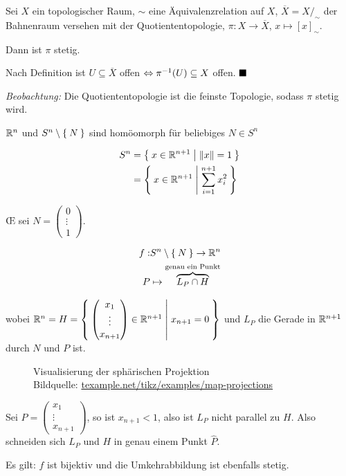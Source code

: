 \begin{korollar}
    Sei $X$ ein topologischer Raum, $\sim$ eine Äquivalenzrelation auf
    $X$, $\overline{X} = X /_\sim$ der Bahnenraum versehen mit der
    Quotiententopologie, $\pi:X \rightarrow \overline{X}$, $x \mapsto [x]_\sim$.

    Dann ist $\pi$ stetig.
\end{korollar}

\begin{beweis}
    Nach Definition ist 
    $U \subseteq \overline{X}$ offen $\Leftrightarrow \pi^{-1}(U) \subseteq X$ 
    offen. $\qed$
\end{beweis}

\emph{Beobachtung:} Die Quotiententopologie ist die feinste Topologie,
sodass $\pi$ stetig wird.

\begin{beispiel} 
    $\mathbb{R}^n$ und $S^n \setminus \Set{N}$ sind homöomorph für
    beliebiges $N \in S^n$

    \begin{align*}
        S^n &= \Set{x \in \ensuremath{\mathbb{R}}^{n+1} | \|x\| = 1}\\
            &= \Set{x \in \ensuremath{\mathbb{R}}^{n+1} | \sum_{i=1}^{n+1} x_i^2}
    \end{align*}
    
    \OE{} sei $N = \begin{pmatrix}0\\ \vdots\\ 1\end{pmatrix}$.

    \begin{align*}
        f: &S^n \setminus \Set{N} \rightarrow \mathbb{R}^n\\
        P  &\mapsto \overbrace{L_P \cap H}^\text{genau ein Punkt}
    \end{align*}

    wobei $\mathbb{R}^n = H = \Set{\begin{pmatrix}x_1\\ \vdots \\ x_{n+1}\end{pmatrix} \in \ensuremath{\mathbb{R}}^{n+1} | x_{n+1} = 0}$
    und $L_P$ die Gerade in $\mathbb{R}^{n+1}$ durch $N$ und $P$ ist.

    \begin{figure}[htp]
        \centering
        
        \caption{Visualisierung der sphärischen Projektion\\Bildquelle: \href{http://texample.net/tikz/examples/map-projections/}{texample.net/tikz/examples/map-projections}}
    \end{figure}

    Sei $P = \begin{pmatrix}x_1\\ \vdots \\ x_{n+1}\end{pmatrix}$, so
    ist $x_{n+1} < 1$, also ist $L_P$ nicht parallel zu $H$. Also
    schneiden sich $L_P$ und $H$ in genau einem Punkt $\hat{P}$.

    Es gilt: $f$ ist bijektiv und die Umkehrabbildung ist ebenfalls
    stetig.    
\end{beispiel}

